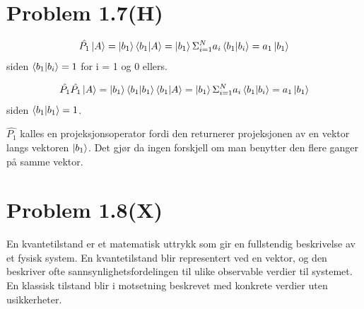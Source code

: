 \documentclass[norsk,a4paper,12pt]{article}
\begin{document}
	\section*{Problem 1.7(H)}
	
	\begin{equation}
	\begin{aligned}
	\hat{P_1}\ket{A} = \ket{b_1} \braket{b_1}{A} = \ket{b_1} \Sigma_{i=1}^{N} a_i \braket{b_1}{b_i} = a_1 \ket{b_1}
	\end{aligned}
	\end{equation}
	siden $\braket{b_1}{b_i} = 1$ for i = 1 og 0 ellers.
	
	\begin{equation}
	\begin{aligned}
	\hat{P_1}\hat{P_1}\ket{A} = \ket{b_1} \braket{b_1}{b_1} \braket{b_1}{A} = \ket{b_1} \Sigma_{i=1}^{N} a_i \braket{b_1}{b_i} = a_1 \ket{b_1}
	\end{aligned}
	\end{equation}
	siden $\braket{b_1}{b_1} = 1$.
	
	$\hat{P_1}$ kalles en projeksjonsoperator fordi den returnerer projeksjonen av en vektor langs vektoren $\ket{b_1}$. Det gjør da ingen forskjell om man benytter den flere ganger på samme vektor.
	
	\section*{Problem 1.8(X)}
	En kvantetilstand er et matematisk uttrykk som gir en fullstendig beskrivelse av et fysisk system. En kvantetilstand blir representert ved en vektor, og den beskriver ofte sannsynlighetsfordelingen til ulike observable verdier til systemet. En klassisk tilstand blir i motsetning beskrevet med konkrete verdier uten usikkerheter.
	
\end{document}
